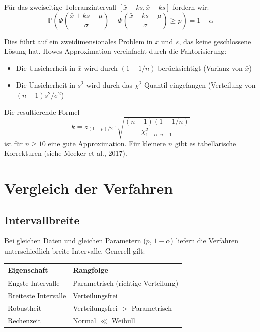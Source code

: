 \documentclass[10pt,a4paper,twocolumn]{article}
\theoremstyle{definition}
\newcommand{\TI}{Toleranzintervall}
\newcommand{\Prob}{\mathbb{P}}
\newcommand{\xbar}{\bar{x}}
\begin{document}
Für das zweiseitige \TI{} $[\xbar - ks, \xbar + ks]$
fordern wir:
\begin{equation}
    \Prob\!\left(\Phi\!\left(\frac{\xbar + ks - \mu}{\sigma}\right)
    - \Phi\!\left(\frac{\xbar - ks - \mu}{\sigma}\right)
    \geq p\right) = 1 - \alpha
\end{equation}

Dies führt auf ein zweidimensionales Problem in $\xbar$ und $s$,
das keine geschlossene Lösung hat. Howes Approximation vereinfacht
durch die Faktorisierung:
\begin{itemize}[nosep,leftmargin=*]
    \item Die Unsicherheit in $\xbar$ wird durch $(1 + 1/n)$
          berücksichtigt (Varianz von $\xbar$)
    \item Die Unsicherheit in $s^2$ wird durch das $\chi^2$-Quantil
          eingefangen (Verteilung von $(n-1)s^2/\sigma^2$)
\end{itemize}

Die resultierende Formel
\begin{equation}
    k = z_{(1+p)/2} \cdot
    \sqrt{\frac{(n-1)(1 + 1/n)}{\chi^2_{1-\alpha,\,n-1}}}
\end{equation}
ist für $n \geq 10$ eine gute Approximation. Für kleinere $n$
gibt es tabellarische Korrekturen (siehe Meeker et al., 2017).


\section{Vergleich der Verfahren}
\label{sec:vergleich}

\subsection{Intervallbreite}

Bei gleichen Daten und gleichen Parametern ($p$, $1-\alpha$)
liefern die Verfahren unterschiedlich breite Intervalle.
Generell gilt:

\begin{center}
\begin{tabular}{@{}ll@{}}
\toprule
Eigenschaft & Rangfolge \\
\midrule
Engste Intervalle & Parametrisch (richtige Verteilung) \\
Breiteste Intervalle & Verteilungsfrei \\
Robustheit & Verteilungsfrei $>$ Parametrisch \\
Rechenzeit & Normal $\ll$ Weibull \\
\bottomrule
\end{tabular}
\end{center}
\end{document}

